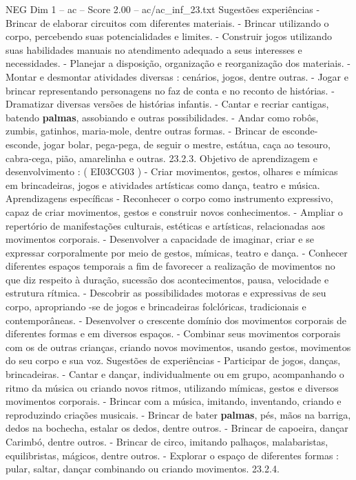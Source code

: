\begin{textsample}{NEG Dim 1 – ac – Score 2.00 – ac/ac\_inf\_23.txt}
Sugestões experiências - Brincar de elaborar circuitos com diferentes materiais. - Brincar utilizando o corpo, percebendo suas potencialidades e limites. - Construir jogos utilizando suas habilidades manuais no atendimento adequado a seus interesses e necessidades. - Planejar a disposição, organização e reorganização dos materiais. - Montar e desmontar atividades diversas : cenários, jogos, dentre outras. - Jogar e brincar representando personagens no faz de conta e no reconto de histórias. - Dramatizar diversas versões de histórias infantis. - Cantar e recriar cantigas, batendo \textbf{palmas}, assobiando e outras possibilidades. - Andar como robôs, zumbis, gatinhos, maria-mole, dentre outras formas. - Brincar de esconde-esconde, jogar bolar, pega-pega, de seguir o mestre, estátua, caça ao tesouro, cabra-cega, pião, amarelinha e outras. 23.2.3.
Objetivo de aprendizagem e desenvolvimento : ( EI03CG03 ) - Criar movimentos, gestos, olhares e mímicas em brincadeiras, jogos e atividades artísticas como dança, teatro e música.
Aprendizagens específicas - Reconhecer o corpo como instrumento expressivo, capaz de criar movimentos, gestos e construir novos conhecimentos. - Ampliar o repertório de manifestações culturais, estéticas e artísticas, relacionadas aos movimentos corporais. - Desenvolver a capacidade de imaginar, criar e se expressar corporalmente por meio de gestos, mímicas, teatro e dança. - Conhecer diferentes espaços temporais a fim de favorecer a realização de movimentos no que diz respeito à duração, sucessão dos acontecimentos, pausa, velocidade e estrutura rítmica. - Descobrir as possibilidades motoras e expressivas de seu corpo, apropriando -se de jogos e brincadeiras folclóricas, tradicionais e contemporâneas. - Desenvolver o crescente domínio dos movimentos corporais de diferentes formas e em diversos espaços. - Combinar seus movimentos corporais com os de outras crianças, criando novos movimentos, usando gestos, movimentos do seu corpo e sua voz.
Sugestões de experiências - Participar de jogos, danças, brincadeiras. - Cantar e dançar, individualmente ou em grupo, acompanhando o ritmo da música ou criando novos ritmos, utilizando mímicas, gestos e diversos movimentos corporais. - Brincar com a música, imitando, inventando, criando e reproduzindo criações musicais. - Brincar de bater \textbf{palmas}, pés, mãos na barriga, dedos na bochecha, estalar os dedos, dentre outros. - Brincar de capoeira, dançar Carimbó, dentre outros. - Brincar de circo, imitando palhaços, malabaristas, equilibristas, mágicos, dentre outros. - Explorar o espaço de diferentes formas : pular, saltar, dançar combinando ou criando movimentos. 23.2.4.

\end{textsample}
